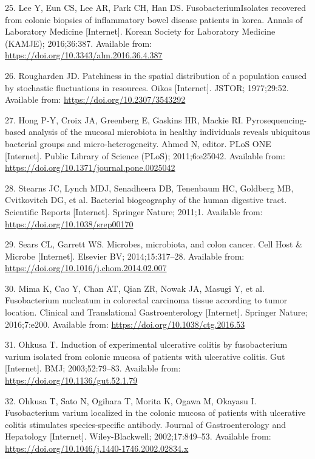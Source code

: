 \documentclass[12pt,]{article}
\begin{document}
\hypertarget{ref-Lee2016}{}
25. Lee Y, Eun CS, Lee AR, Park CH, Han DS. FusobacteriumIsolates
recovered from colonic biopsies of inflammatory bowel disease patients
in korea. Annals of Laboratory Medicine {[}Internet{]}. Korean Society
for Laboratory Medicine (KAMJE); 2016;36:387. Available from:
\url{https://doi.org/10.3343/alm.2016.36.4.387}

\hypertarget{ref-Rougharden1977}{}
26. Rougharden JD. Patchiness in the spatial distribution of a
population caused by stochastic fluctuations in resources. Oikos
{[}Internet{]}. JSTOR; 1977;29:52. Available from:
\url{https://doi.org/10.2307/3543292}

\hypertarget{ref-Hong2011}{}
27. Hong P-Y, Croix JA, Greenberg E, Gaskins HR, Mackie RI.
Pyrosequencing-based analysis of the mucosal microbiota in healthy
individuals reveals ubiquitous bacterial groups and micro-heterogeneity.
Ahmed N, editor. PLoS ONE {[}Internet{]}. Public Library of Science
(PLoS); 2011;6:e25042. Available from:
\url{https://doi.org/10.1371/journal.pone.0025042}

\hypertarget{ref-Stearns2011}{}
28. Stearns JC, Lynch MDJ, Senadheera DB, Tenenbaum HC, Goldberg MB,
Cvitkovitch DG, et al. Bacterial biogeography of the human digestive
tract. Scientific Reports {[}Internet{]}. Springer Nature; 2011;1.
Available from: \url{https://doi.org/10.1038/srep00170}

\hypertarget{ref-Sears2014}{}
29. Sears CL, Garrett WS. Microbes, microbiota, and colon cancer. Cell
Host \& Microbe {[}Internet{]}. Elsevier BV; 2014;15:317--28. Available
from: \url{https://doi.org/10.1016/j.chom.2014.02.007}

\hypertarget{ref-Mima2016}{}
30. Mima K, Cao Y, Chan AT, Qian ZR, Nowak JA, Masugi Y, et al.
Fusobacterium nucleatum in colorectal carcinoma tissue according to
tumor location. Clinical and Translational Gastroenterology
{[}Internet{]}. Springer Nature; 2016;7:e200. Available from:
\url{https://doi.org/10.1038/ctg.2016.53}

\hypertarget{ref-Ohkusa2003}{}
31. Ohkusa T. Induction of experimental ulcerative colitis by
fusobacterium varium isolated from colonic mucosa of patients with
ulcerative colitis. Gut {[}Internet{]}. BMJ; 2003;52:79--83. Available
from: \url{https://doi.org/10.1136/gut.52.1.79}

\hypertarget{ref-Ohkusa2002}{}
32. Ohkusa T, Sato N, Ogihara T, Morita K, Ogawa M, Okayasu I.
Fusobacterium varium localized in the colonic mucosa of patients with
ulcerative colitis stimulates species-specific antibody. Journal of
Gastroenterology and Hepatology {[}Internet{]}. Wiley-Blackwell;
2002;17:849--53. Available from:
\url{https://doi.org/10.1046/j.1440-1746.2002.02834.x}
\end{document}
